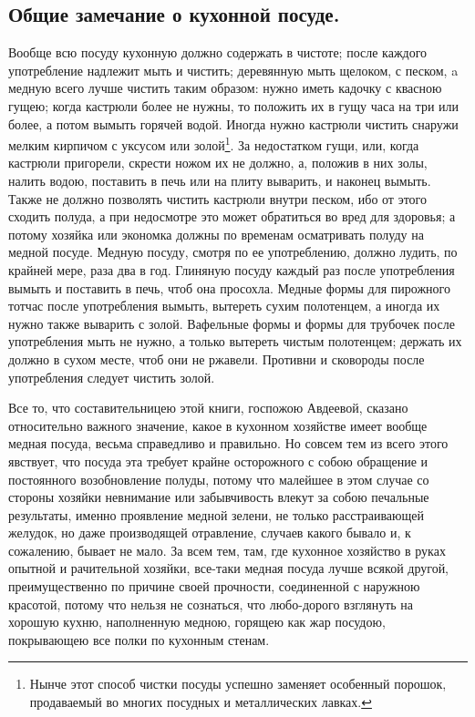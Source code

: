 \subsection{Общие замечание о кухонной посуде.}
Вообще всю посуду кухонную должно содержать в чистоте; после каждого употребление надлежит мыть и чистить; деревянную мыть щелоком, с песком, a медную всего лучше чистить таким образом: нужно иметь кадочку с квасною гущею; когда кастрюли более не нужны, то положить их в гущу часа на три или более, а потом вымыть горячей водой. Иногда нужно кастрюли чистить снаружи мелким кирпичом с уксусом или золой\footnote{Нынче этот способ чистки посуды успешно заменяет особенный порошок, продаваемый во многих посудных и металлических лавках.}. За недостатком гущи, или, когда кастрюли пригорели, скрести ножом их не должно, а, положив в них золы, налить водою, поставить в печь или на плиту выварить, и наконец вымыть. Также не должно позволять чистить кастрюли внутри песком, ибо от этого сходить полуда, а при недосмотре это может обратиться во вред для здоровья; а потому хозяйка или экономка должны по временам осматривать полуду на медной посуде. Медную посуду, смотря по ее употреблению, должно лудить, по крайней мере, раза два в год. Глиняную посуду каждый раз после употребления вымыть и поставить в печь, чтоб она просохла. Медные формы для пирожного тотчас после употребления вымыть, вытереть сухим полотенцем, а иногда их нужно также выварить с золой. Вафельные формы и формы для трубочек после употребления мыть не нужно, а только вытереть чистым полотенцем; держать их должно в сухом месте, чтоб они не ржавели. Противни и сковороды после употребления следует чистить золой.

Все то, что составительницею этой книги, госпожою Авдеевой, сказано относительно важного значение, какое в кухонном хозяйстве имеет вообще медная посуда, весьма справедливо и правильно. Но совсем тем из всего этого явствует, что посуда эта требует крайне осторожного с собою обращение и постоянного возобновление полуды, потому что малейшее в этом случае со стороны хозяйки невнимание или забывчивость влекут за собою печальные результаты, именно проявление медной зелени, не только расстраивающей желудок, но даже производящей отравление, случаев какого бывало и, к сожалению, бывает не мало. За всем тем, там, где кухонное хозяйство в руках опытной и рачительной хозяйки, все-таки медная посуда лучше всякой другой, преимущественно по причине своей прочности, соединенной с наружною красотой, потому что нельзя не сознаться, что любо-дорого взглянуть на хорошую кухню, наполненную медною, горящею как жар посудою, покрывающею все полки по кухонным стенам.

